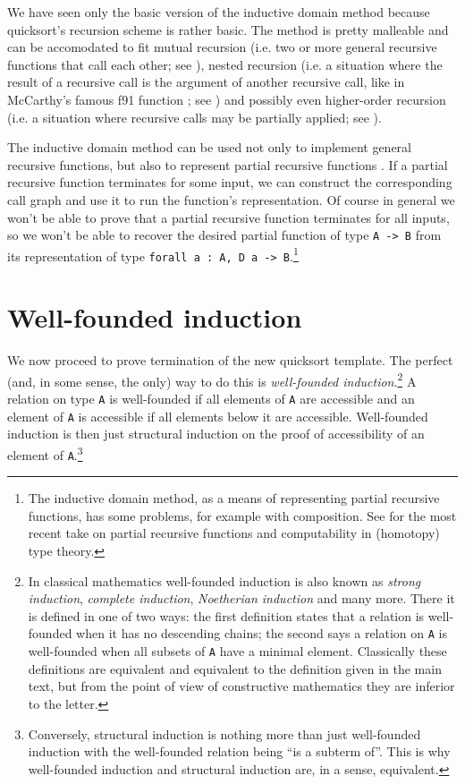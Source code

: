 \documentclass[declaration,mgr,english,shortabstract]{iithesis}
\newcommand{\m}[1]{\texttt{#1}}
\begin{document}
We have seen only the basic version of the inductive domain method because quicksort's recursion scheme is rather basic. The method is pretty malleable and can be accomodated to fit mutual recursion (i.e. two or more general recursive functions that call each other; see \cite{BCM3}), nested recursion (i.e. a situation where the result of a recursive call is the argument of another recursive call, like in McCarthy's famous f91 function \cite{f91}; see \cite{BCM2}) and possibly even higher-order recursion (i.e. a situation where recursive calls may be partially applied; see \cite{BCM6}).

The inductive domain method can be used not only to implement general recursive functions, but also to represent partial recursive functions \cite{BCM8}. If a partial recursive function terminates for some input, we can construct the corresponding call graph and use it to run the function's representation. Of course in general we won't be able to prove that a partial recursive function terminates for all inputs, so we won't be able to recover the desired partial function of type \m{A -> B} from its representation of type \m{forall a\ :\ A, D a -> B}.\footnote{The inductive domain method, as a means of representing partial recursive functions, has some problems, for example with composition. See \cite{Knapp} for the most recent take on partial recursive functions and computability in (homotopy) type theory.}

\section{Well-founded induction}

We now proceed to prove termination of the new quicksort template. The perfect (and, in some sense, the only) way to do this is \textit{well-founded induction}.\footnote{In classical mathematics well-founded induction is also known as \textit{strong induction}, \textit{complete induction}, \textit{Noetherian induction} and many more. There it is defined in one of two ways: the first definition states that a relation is well-founded when it has no descending chains; the second says a relation on \m{A} is well-founded when all subsets of \m{A} have a minimal element. Classically these definitions are equivalent and equivalent to the definition given in the main text, but from the point of view of constructive mathematics they are inferior to the letter.} A relation on type \m{A} is well-founded if all elements of \m{A} are accessible and an element of \m{A} is accessible if all elements below it are accessible. Well-founded induction is then just structural induction on the proof of accessibility of an element of \m{A}.\footnote{Conversely, structural induction is nothing more than just well-founded induction with the well-founded relation being ``is a subterm of''. This is why well-founded induction and structural induction are, in a sense, equivalent.}
\end{document}
